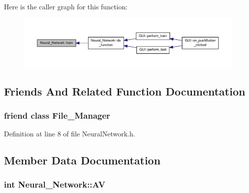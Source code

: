Here is the caller graph for this function\-:
\nopagebreak
\begin{figure}[H]
\begin{center}
\leavevmode
\includegraphics[width=350pt]{d1/d7c/a00003_a033f4f60812c0359cc50815e957f11f7_icgraph}
\end{center}
\end{figure}




\subsection{Friends And Related Function Documentation}
\hypertarget{a00003_a96aa84fcda6b19a74fff9d19c16b07fe}{
\subsubsection[{File\-\_\-\-Manager}]{\setlength{\rightskip}{0pt plus 5cm}friend class {\bf File\-\_\-\-Manager}\hspace{0.3cm}{\ttfamily [friend]}}}\label{d1/d7c/a00003_a96aa84fcda6b19a74fff9d19c16b07fe}


Definition at line 8 of file Neural\-Network.\-h.



\subsection{Member Data Documentation}
\hypertarget{a00003_a970136042929b26220d35be2776220a6}{
\subsubsection[{A\-V}]{\setlength{\rightskip}{0pt plus 5cm}int Neural\-\_\-\-Network\-::\-A\-V\hspace{0.3cm}{\ttfamily [private]}}}\label{d1/d7c/a00003_a970136042929b26220d35be2776220a6}


